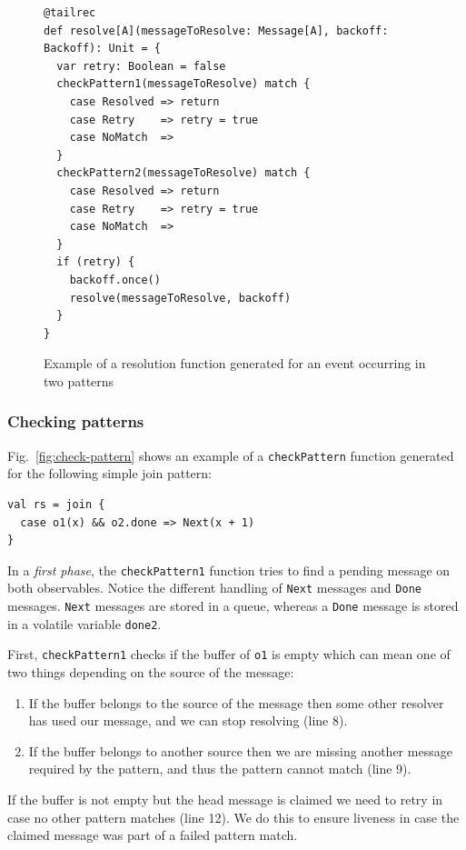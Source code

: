 \documentclass[runningheads]{llncs}
\begin{document}
\begin{sloppypar}
\begin{figure}[ht]
\centering
\lstset{numbers=left}
\begin{lstlisting}[escapechar=!]
@tailrec
def resolve[A](messageToResolve: Message[A], backoff: Backoff): Unit = {
  var retry: Boolean = false
  checkPattern1(messageToResolve) match {
    case Resolved => return
    case Retry    => retry = true
    case NoMatch  =>
  }
  checkPattern2(messageToResolve) match {
    case Resolved => return
    case Retry    => retry = true
    case NoMatch  =>
  }
  if (retry) {
    backoff.once()
    resolve(messageToResolve, backoff)
  }
}
\end{lstlisting}
\caption{Example of a resolution function generated for an event occurring in two patterns}
\label{fig:resolve}
\end{figure}


\subsubsection{Checking patterns}

Fig.~\ref{fig:check-pattern} shows an example of a \verb|checkPattern|
function generated for the following simple join pattern:

\begin{lstlisting}
val rs = join {
  case o1(x) && o2.done => Next(x + 1)
}
\end{lstlisting}
\noindent
In a {\em first phase}, the \verb|checkPattern1| function tries to find a
pending message on both observables. Notice the different handling of
\texttt{Next} messages and \texttt{Done} messages. \texttt{Next} messages are
stored in a queue, whereas a \texttt{Done} message is stored in a volatile
variable \texttt{done2}.

First, \verb|checkPattern1| checks if the buffer of \verb|o1| is empty which
can mean one of two things depending on the source of the message:

\begin{enumerate}
\item If the buffer belongs to the source of the message then some other
      resolver has used our message, and we can stop resolving (line 8).
\item If the buffer belongs to another source then we are missing another
      message required by the pattern, and thus the pattern cannot match
      (line 9).
\end{enumerate}
\noindent
If the buffer is not empty but the head message is claimed we need to retry in
case no other pattern matches (line 12). We do this to ensure liveness in case
the claimed message was part of a failed pattern match.


\end{sloppypar}
\end{document}
